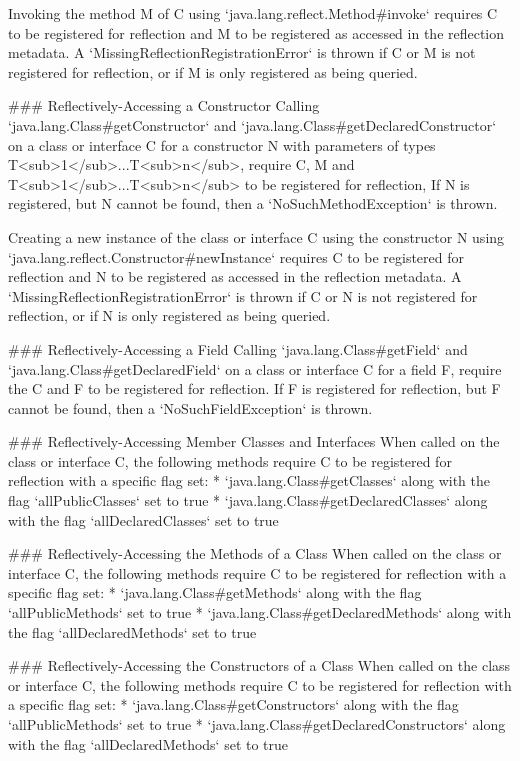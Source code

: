 Invoking the method M of C using `java.lang.reflect.Method#invoke` requires C to be registered for reflection
and M to be registered as accessed in the reflection metadata.
A `MissingReflectionRegistrationError` is thrown if C or M is not registered for reflection, or 
if M is only registered as being queried.

### Reflectively-Accessing a Constructor
Calling `java.lang.Class#getConstructor` and `java.lang.Class#getDeclaredConstructor` on a class or interface C 
for a constructor N with parameters of types T<sub>1</sub>...T<sub>n</sub>, require C, M and T<sub>1</sub>...T<sub>n</sub>
to be registered for reflection,
If N is registered, but N cannot be found, then a `NoSuchMethodException` is thrown.

Creating a new instance of the class or interface C using the constructor N using
`java.lang.reflect.Constructor#newInstance` requires C to be registered for reflection
and N to be registered as accessed in the reflection metadata.
A `MissingReflectionRegistrationError` is thrown if C or N is not registered for reflection, or
if N is only registered as being queried.

### Reflectively-Accessing a Field
Calling `java.lang.Class#getField` and `java.lang.Class#getDeclaredField` on a class or interface C for a field F,
require the C and F to be registered for reflection.
If F is registered for reflection, but F cannot be found, then a `NoSuchFieldException` is thrown.

### Reflectively-Accessing Member Classes and Interfaces
When called on the class or interface C, the following methods require C to be registered for reflection with
a specific flag set:
* `java.lang.Class#getClasses` along with the flag `allPublicClasses` set to true
* `java.lang.Class#getDeclaredClasses` along with the flag `allDeclaredClasses` set to true

### Reflectively-Accessing the Methods of a Class
When called on the class or interface C, the following methods require C to be registered for reflection with 
a specific flag set:
* `java.lang.Class#getMethods` along with the flag `allPublicMethods` set to true
* `java.lang.Class#getDeclaredMethods` along with the flag `allDeclaredMethods` set to true

### Reflectively-Accessing the Constructors of a Class
When called on the class or interface C, the following methods require C to be registered for reflection with
a specific flag set:
* `java.lang.Class#getConstructors` along with the flag `allPublicMethods` set to true
* `java.lang.Class#getDeclaredConstructors` along with the flag `allDeclaredMethods` set to true


